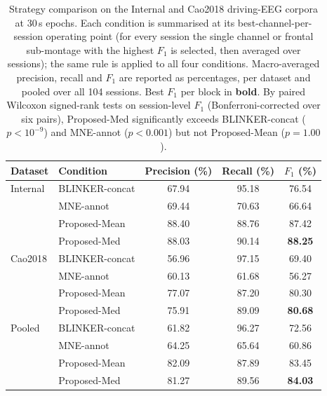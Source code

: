 \begin{table}[ht]
  \centering
  \caption{Strategy comparison on the Internal and Cao2018 driving-EEG corpora at 30\,s epochs. Each condition is summarised at its best-channel-per-session operating point (for every session the single channel or frontal sub-montage with the highest $F_1$ is selected, then averaged over sessions); the same rule is applied to all four conditions. Macro-averaged precision, recall and $F_1$ are reported as percentages, per dataset and pooled over all 104 sessions. Best $F_1$ per block in \textbf{bold}. By paired Wilcoxon signed-rank tests on session-level $F_1$ (Bonferroni-corrected over six pairs), Proposed-Med significantly exceeds BLINKER-concat ($p<10^{-9}$) and MNE-annot ($p<0.001$) but not Proposed-Mean ($p=1.00$).}
  \label{tab:exp1_main}
  \begin{tabular}{llccc}
    \toprule
    Dataset & Condition & Precision (\%) & Recall (\%) & $F_1$ (\%) \\
    \midrule
    Internal & BLINKER-concat & 67.94 & 95.18 & 76.54 \\
     & MNE-annot & 69.44 & 70.63 & 66.64 \\
     & Proposed-Mean & 88.40 & 88.76 & 87.42 \\
     & Proposed-Med & 88.03 & 90.14 & \textbf{88.25} \\
    \midrule
    Cao2018 & BLINKER-concat & 56.96 & 97.15 & 69.40 \\
     & MNE-annot & 60.13 & 61.68 & 56.27 \\
     & Proposed-Mean & 77.07 & 87.20 & 80.30 \\
     & Proposed-Med & 75.91 & 89.09 & \textbf{80.68} \\
    \midrule
    Pooled & BLINKER-concat & 61.82 & 96.27 & 72.56 \\
     & MNE-annot & 64.25 & 65.64 & 60.86 \\
     & Proposed-Mean & 82.09 & 87.89 & 83.45 \\
     & Proposed-Med & 81.27 & 89.56 & \textbf{84.03} \\
    \bottomrule
  \end{tabular}
\end{table}
